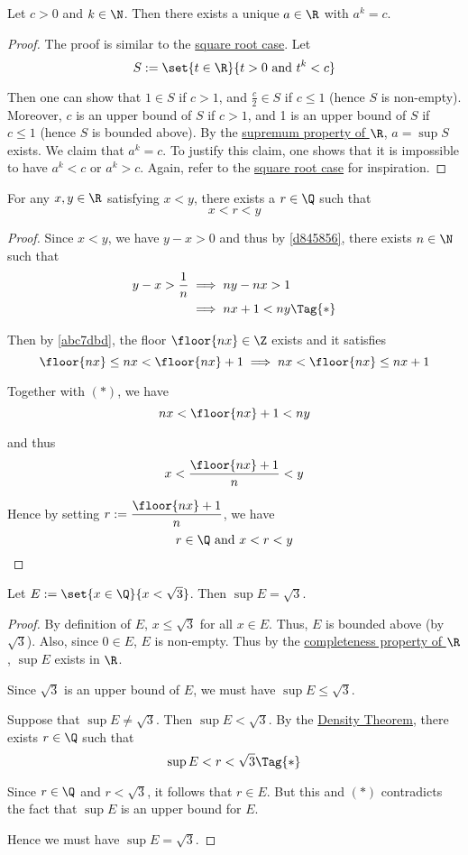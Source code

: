 Let $c>0$ and $k\in\N$. Then there exists a unique $a\in\R$ with $a^k=c$.

\begin{proof}
  The proof is similar to the \href{b88beb7}{square root case}. Let
  $$
    S:=\set{t\in\R}{t>0\text{ and }t^k<c}
  $$

  Then one can show that $1\in S$ if $c>1$, and $\frac c2\in S$ if $c\leq1$
  (hence $S$ is non-empty). Moreover, $c$ is an upper bound of $S$ if $c>1$,
  and 1 is an upper bound of $S$ if $c\leq1$ (hence $S$ is bounded above). By
  the \href{f330cf9}{supremum property of $\R$}, $a=\sup S$ exists. We claim
  that $a^k=c$. To justify this claim, one shows that it is impossible to have
  $a^k<c$ or $a^k>c$. Again, refer to the \href{b88beb7}{square root case} for
  inspiration.
\end{proof}

\label{d0c9c52}

For any $x,y\in\R$ satisfying $x<y$, there exists a $r\in\Q$ such that
$$
  x<r<y
$$

\begin{proof}
  Since $x<y$, we have $y-x>0$ and thus by \autoref{d845856}, there exists
  $n\in\N$ such that
  \begin{align*}
    y-x>\frac1n &\implies ny-nx>1        \\
                &\implies nx+1<ny\Tag{*}
  \end{align*}

  Then by \autoref{abc7dbd}, the floor $\floor{nx}\in\Z$ exists and it
  satisfies
  $$
    \floor{nx}\leq nx <\floor{nx}+1\implies nx<\floor{nx}\leq nx+1
  $$

  Together with $(*)$, we have
  $$
    nx<\floor{nx}+1<ny
  $$

  and thus
  $$
    x<\frac{\floor{nx}+1}{n}<y
  $$

  Hence by setting $r:=\dfrac{\floor{nx}+1}{n}$, we have
  $$
    r\in\Q\text{ and }x<r<y
  $$
\end{proof}

\label{ade99b7}

Let $E:=\set{x\in\Q}{x<\sqrt3}$. Then $\sup E=\sqrt3$.

\begin{proof}
  By definition of $E$, $x\leq\sqrt3$ for all $x\in E$. Thus, $E$ is bounded
  above (by $\sqrt3$). Also, since $0\in E$, $E$ is non-empty. Thus by the
  \href{f330cf9}{completeness property of $\R$}, $\sup E$ exists in $\R$.

  Since $\sqrt3$ is an upper bound of $E$, we must have $\sup E\leq\sqrt3$.

  Suppose that $\sup E\neq\sqrt3$. Then $\sup E<\sqrt3$. By the
  \href{d0c9c52}{Density Theorem}, there exists $r\in\Q$ such that
  \begin{equation*}
    \sup E<r<\sqrt3\Tag{*}
  \end{equation*}

  Since $r\in\Q$ and $r<\sqrt3$, it follows that $r\in E$. But this and $(*)$
  contradicts the fact that $\sup E$ is an upper bound for $E$.

  Hence we must have $\sup E=\sqrt3$.
\end{proof}

